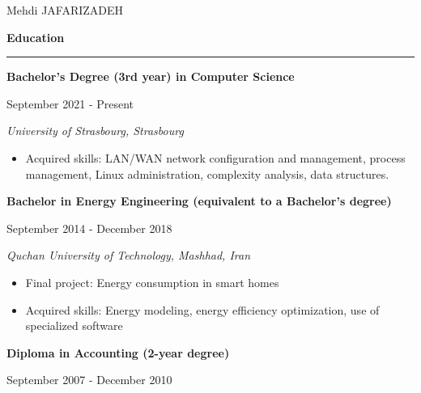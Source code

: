 \documentclass[a4paper]{letter}
\newcommand{\divider}{\rule{\linewidth}{0.9pt}}
\begin{document}
\begin{minipage}[t]{0.60\textwidth}


\setlength{\baselineskip}{1.5\baselineskip}
\vspace{0.7cm}

{\huge Mehdi JAFARIZADEH}

\vspace{0.5cm}


{\large \textbf{Education}}
\divider

{\textbf{Bachelor's Degree (3rd year) in Computer Science}}

{\footnotesize September 2021 - Present}

{\textit{University of Strasbourg, Strasbourg}}

 

\begin{itemize}
    \footnotesize
    \item Acquired skills: LAN/WAN network configuration and management, process management, Linux administration, complexity analysis, data structures.
\end{itemize}

\vspace{ 2mm}

{\textbf{Bachelor in Energy Engineering (equivalent to a Bachelor's degree)}}

{\footnotesize September 2014 - December 2018}

{\textit{Quchan University of Technology, Mashhad, Iran}}

 

\begin{itemize}
    \footnotesize
    \item Final project: Energy consumption in smart homes
    \item Acquired skills: Energy modeling, energy efficiency optimization, use of specialized software
\end{itemize}

\vspace{ 2mm}

{\textbf{Diploma in Accounting (2-year degree)}}

{\footnotesize September 2007 - December 2010}


\end{minipage}
\end{document}
